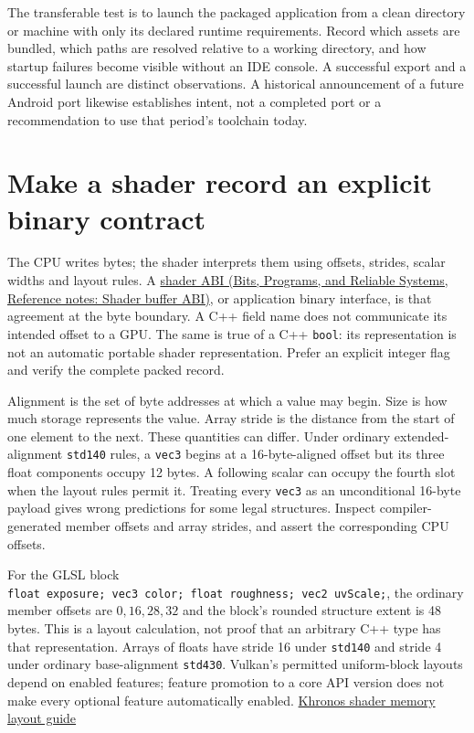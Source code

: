 The transferable test is to launch the packaged application from a clean directory or machine with only its declared runtime requirements. Record which assets are bundled, which paths are resolved relative to a working directory, and how startup failures become visible without an IDE console. A successful export and a successful launch are distinct observations. A historical announcement of a future Android port likewise establishes intent, not a completed port or a recommendation to use that period's toolchain today.

\section{Make a shader record an explicit binary contract}\label{01-foundations-i-ch008-make-a-shader-record-an-explicit-binary-contract}

The CPU writes bytes; the shader interprets them using offsets, strides, scalar widths and layout rules. A \href{../01-Bits-Programs-and-Reliable-Systems/main.pdf\#nameddest=appendix-749048795dbb}{shader ABI (Bits, Programs, and Reliable Systems, Reference notes: Shader buffer ABI)}, or application binary interface, is that agreement at the byte boundary. A C++ field name does not communicate its intended offset to a GPU. The same is true of a C++ \texttt{bool}: its representation is not an automatic portable shader representation. Prefer an explicit integer flag and verify the complete packed record.

Alignment is the set of byte addresses at which a value may begin. Size is how much storage represents the value. Array stride is the distance from the start of one element to the next. These quantities can differ. Under ordinary extended-alignment \texttt{std140} rules, a \texttt{vec3} begins at a 16-byte-aligned offset but its three float components occupy 12 bytes. A following scalar can occupy the fourth slot when the layout rules permit it. Treating every \texttt{vec3} as an unconditional 16-byte payload gives wrong predictions for some legal structures. Inspect compiler-generated member offsets and array strides, and assert the corresponding CPU offsets.

For the GLSL block \texttt{float\ exposure;\ vec3\ color;\ float\ roughness;\ vec2\ uvScale;}, the ordinary member offsets are \(0,16,28,32\) and the block's rounded structure extent is 48 bytes. This is a layout calculation, not proof that an arbitrary C++ type has that representation. Arrays of floats have stride 16 under \texttt{std140} and stride 4 under ordinary base-alignment \texttt{std430}. Vulkan's permitted uniform-block layouts depend on enabled features; feature promotion to a core API version does not make every optional feature automatically enabled. \href{https://docs.vulkan.org/guide/latest/shader_memory_layout.html}{Khronos shader memory layout guide}

